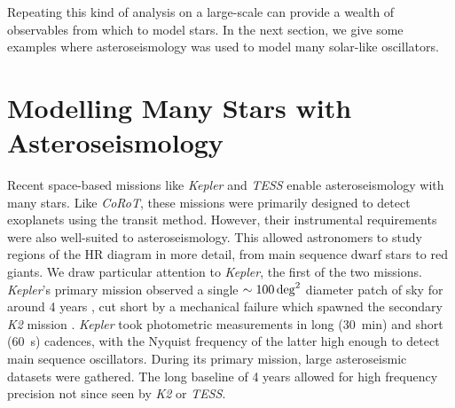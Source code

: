 

Repeating this kind of analysis on a large-scale can provide a wealth of observables from which to model stars. In the next section, we give some examples where asteroseismology was used to model many solar-like oscillators.

\section[Modelling Stars with Asteroseismology]{Modelling Many Stars with Asteroseismology}\label{sec:many-stars}

Recent space-based missions like \emph{Kepler} and \emph{TESS} enable asteroseismology with many stars. Like \emph{CoRoT}, these missions were primarily designed to detect exoplanets using the transit method. However, their instrumental requirements were also well-suited to asteroseismology. This allowed astronomers to study regions of the HR diagram in more detail, from main sequence dwarf stars to red giants. We draw particular attention to \emph{Kepler}, the first of the two missions. \emph{Kepler}'s primary mission observed a single \(\sim\SI{100}{deg\squared}\) diameter patch of sky for around 4 years \citep{Borucki.Koch.ea2010}, cut short by a mechanical failure which spawned the secondary \emph{K2} mission \citep{Howell.Sobeck.ea2014}. \emph{Kepler} took photometric measurements in long (\SI{30}{\minute}) and short (\SI{60}{\second}) cadences, with the Nyquist frequency of the latter high enough to detect main sequence oscillators. During its primary mission, large asteroseismic datasets were gathered. The long baseline of 4 years allowed for high frequency precision not since seen by \emph{K2} or \emph{TESS}.

